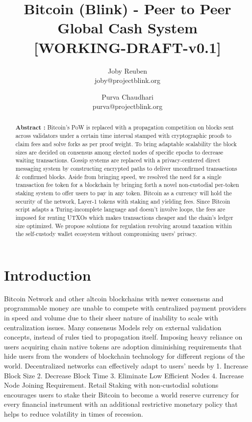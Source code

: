 \documentclass[a4paper,10pt]{article}
\title{
 \large \textbf{Bitcoin (Blink) - Peer to Peer Global Cash System}\\
\vspace{6mm}
\scriptsize [WORKING-DRAFT-v0.1]
}
\author{ \myfontt Joby Reuben \\ \myfontt joby@projectblink.org \and  \myfontt Purva Chaudhari \\ \myfontt purva@projectblink.org}
\date{}
\begin{document}
\maketitle
\begin{abstract}
\noindent \textbf{Abstract :} Bitcoin's PoW is replaced with a propagation competition on blocks sent across validators under a certain time interval stamped with cryptographic proofs to claim fees and solve forks as per proof weight. To bring adaptable scalability the block sizes are decided on consensus among elected nodes of specific epochs to decrease waiting transactions. Gossip systems are replaced with a privacy-centered direct messaging system by constructing encrypted paths to deliver unconfirmed transactions \& confirmed blocks. Aside from bringing speed, we resolved the need for a single transaction fee token for a blockchain by bringing forth a novel non-custodial per-token staking system to offer users to pay in any token. Bitcoin as a currency will hold the security of the network, Layer-1 tokens with staking and yielding fees. Since Bitcoin script adapts a Turing-incomplete language and doesn't involve loops, the fees are imposed for renting UTXOs which makes transactions cheaper and the chain's ledger size optimized. We propose solutions for regulation revolving around taxation within the self-custody wallet ecosystem without compromising users' privacy. 
\end{abstract}
\section{Introduction}
Bitcoin Network and other altcoin blockchains with newer consensus and programmable money are unable to compete with centralized payment providers in speed and volume due to their sheer nature of inability to scale with centralization issues. Many consensus Models rely on external validation concepts, instead of rules tied to propagation itself. Imposing heavy reliance on users acquiring chain native tokens are adoption diminishing requirements that hide users from the wonders of blockchain technology for different regions of the world. Decentralized networks can effectively adapt to users' needs by 1. Increase Block Size 2. Decrease Block Time 3. Eliminate Low Efficient Nodes 4. Increase Node Joining Requirement. Retail Staking with non-custodial solutions encourages users to stake their Bitcoin to become a world reserve currency for every financial instrument with an additional restrictive monetary policy that helps to reduce volatility in times of recession.
\end{document}
